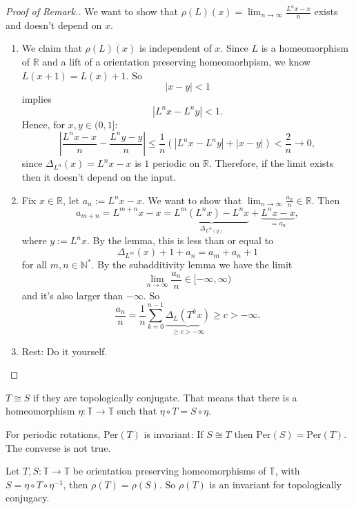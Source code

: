 \documentclass{article}
\newcommand*{\N}{\mathbb{N}}
\newcommand*{\R}{\mathbb{R}}
\newcommand*{\T}{\mathbb{T}}
\newcommand*{\Ns}{\N^*}
\newcommand*{\reci}[1]{{\frac{1}{#1}}}
\newcommand*{\limn}{\lim_{n\to\infty}}
\newcommand*{\Per}{\text{Per}}
\begin{document}
\begin{proof}[Proof of Remark.]
    We want to show that $\rho(L)(x)=\limn\frac{L^nx-x}{n}$ exists and doesn't depend on $x$.
    \begin{enumerate}
        \item We claim that $\rho(L)(x)$ is independent of $x$. Since $L$ is a homeomorphism of $\R$ and a lift of a orientation preserving homeomorhpism, we know $L(x+1)=L(x)+1$. So
        $$|x-y|<1$$
        implies
        $$|L^nx-L^ny|<1.$$
        Hence, for $x,y\in(0,1]:$
        $$\left|\frac{L^nx-x}n-\frac{L^ny-y}n\right|\leq\reci n(|L^nx-L^ny|+|x-y|)<\frac2n\to0,$$
        since $\Delta_{L^n}(x)=L^nx-x$ is $1$ periodic on $\R$. Therefore, if the limit exists then it doesn't depend on the input.

        \item Fix $x\in\R$, let $a_n:=L^nx-x$. We want to show that $\limn\frac{a_n}n\in\R$. Then
        $$a_{m+n}=L^{m+n}x-x=\underbrace{L^m(L^nx)-L^nx}_{\Delta_{L^m(y)}}+\underbrace{L^nx-x}_{=a_n},$$
        where $y:=L^nx$. By the lemma, this is less than or equal to
        $$\Delta_{L^m}(x)+1+a_n=a_m+a_n+1$$
        for all $m,n\in\Ns$. By the subadditivity lemma we have the limit
        $$\limn\frac{a_n}n\in[-\infty,\infty)$$
        and it's also larger than $-\infty$. So
        $$\frac{a_n}n = \reci n\sum_{k=0}^{n-1}\underbrace{\Delta_L(T^kx)}_{\geq c > -\infty}\geq c > -\infty.$$

        \item Rest: Do it yourself.
    \end{enumerate}
\end{proof}

\begin{rec}
    $T\cong S$ if they are topologically conjugate. That means that there is a homeomorphism $\eta:\T\to\T$ such that $\eta\circ T=S\circ \eta$.
\end{rec}

\begin{rec}
    For periodic rotations, $\Per(T)$ is invariant: If $S\cong T$ then $\Per(S) = \Per(T)$. The converse is not true.
\end{rec}

\begin{prop}
    Let $T,S: \T\to\T$ be orientation preserving homeomorphisms of $\T$, with $S=\eta\circ T\circ\eta^{-1}$, then $\rho(T)=\rho(S)$. So $\rho(T)$ is an invariant for topologically conjugacy.
\end{prop}
\end{document}
